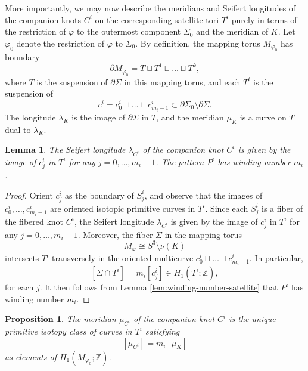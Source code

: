 \documentclass[11pt]{amsart}
\newtheorem {lemma}[theorem]{Lemma}
\newtheorem {proposition}[theorem]{Proposition}
\numberwithin{equation}{section}
\numberwithin{theorem}{section}
\theoremstyle{definition}
\begin{document}
More importantly, we may now describe the meridians and Seifert longitudes of the companion knots $C^i$ on the corresponding satellite tori $T^i$ purely in terms of the restriction of $\varphi$ to the outermost component $\Sigma_0$ and the meridian of $K$. 
Let $\varphi_0$ denote the restriction of $\varphi$ to $\Sigma_0$. By definition, the mapping torus $M_{\varphi_0}$ has boundary \[\partial M_{\varphi_0}  = T \sqcup T^1 \sqcup \dots \sqcup T^k,\] where $T$ is the suspension of $\partial \Sigma$ in this mapping torus, and each $T^i$ is the suspension of \[c^i=c^i_0\sqcup\dots\sqcup c^i_{m_i-1} \subset \partial \Sigma_0\setminus \partial \Sigma.\] The longitude $\lambda_K$ is  the image of $\partial \Sigma$ in $T$, and the meridian $\mu_K$ is a curve on $T$ dual to $\lambda_K$.

\begin{lemma}\label{lem:sat-longitude}
The Seifert longitude $\lambda_{C^i}$ of the companion knot $C^i$ is given by the image of  $c^i_j$ in $T^i$ for any $j=0,\dots,m_i-1$. The pattern $P^i$ has winding number $m_i$.
\end{lemma}

\begin{proof}
Orient  $c^i_j$ as the boundary of $S^i_j$, and observe  that the images of  $c^i_0, \dots, c^i_{m_i-1}$ are oriented isotopic primitive curves in $T^i$. Since each $S^i_j$ is a fiber of the fibered knot $C^i$, the Seifert longitude $\lambda_{C^i}$ is given by the image of  $c^i_j$ in $T^i$ for any $j=0,\dots,m_i-1$. Moreover,  the fiber $\Sigma$ in the mapping torus  \[M_\varphi \cong S^3 \setminus \nu(K)\] intersects $T^i$ transversely in the oriented multicurve  $c^i_0\sqcup\dots\sqcup c^i_{m_i-1}$. In particular, \[[\Sigma\cap T^i] = m_i[c^i_j]\in H_1(T^i;\mathbb{Z}), \] for each $j$. It then follows from  Lemma \ref{lem:winding-number-satellite} that $P^i$ has winding number $m_i$.
\end{proof}

\begin{proposition}\label{prop:sat-meridian}
The meridian $\mu_{C^i}$ of the companion knot $C^i$ is the unique primitive isotopy class of curves in $T^i$ satisfying  \[[\mu_{C^i}] = m_i[\mu_K]\] as elements of $H_1(M_{\varphi_0};\mathbb{Z})$.
\end{proposition}
\end{document}
